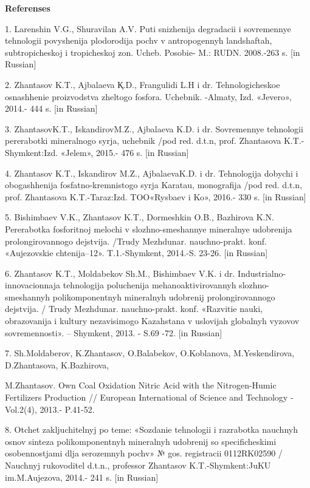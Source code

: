 \begin{center}
{\bfseries Referenses}
\end{center}

\begin{noparindent}
1. Larenshin V.G., Shuravilan A.V. Puti snizhenija degradacii i
sovremennye tehnologii povyshenija plodorodija pochv v antropogennyh
landshaftah, subtropicheskoj i tropicheskoj zon. Ucheb. Posobie- M.:
RUDN. 2008.-263 s. {[}in Russian{]}

2. Zhantasov K.T., Ajbalaeva Қ.D., Frangulidi L.H i dr. Tehnologicheskoe
osnashhenie proizvodstva zheltogo fosfora. Uchebnik. -Almaty, Izd.
«Jevero», 2014.- 444 s. {[}in Russian{]}

3. ZhantasovK.T., IskandirovM.Z., Ajbalaeva K.D. i dr. Sovremennye
tehnologii pererabotki mineral\textquotesingle nogo
syr\textquotesingle ja, uchebnik /pod red. d.t.n, prof. Zhantasova
K.T.-Shymkent:Izd. «Jelem», 2015.- 476 s. {[}in Russian{]}

4. Zhantasov K.T., Iskandirov M.Z., AjbalaevaK.D. i dr. Tehnologija
dobychi i obogashhenija fosfatno-kremnistogo syr\textquotesingle ja
Karatau, monografija /pod red. d.t.n, prof. Zhantasova K.T.-Taraz:Izd.
TOO«Rysbaev i Ko», 2016.- 330 s. {[}in Russian{]}

5. Bishimbaev V.K., Zhantasov K.T., Dormeshkin O.B., Bazhirova K.N.
Pererabotka fosforitnoj melochi v slozhno-smeshannye
mineral\textquotesingle nye udobrenija prolongirovannogo dejstvija.
/Trudy Mezhdunar. nauchno-prakt. konf. «Aujezovskie chtenija--12».
T.1.-Shymkent, 2014.-S. 23-26. {[}in Russian{]}

6. Zhantasov K.T., Moldabekov Sh.M., Bishimbaev V.K. i dr.
Industrial\textquotesingle no-innovacionnaja tehnologija poluchenija
mehanoaktivirovannyh slozhno-smeshannyh polikomponentnyh
mineral\textquotesingle nyh udobrenij prolongirovannogo dejstvija. /
Trudy Mezhdunar. nauchno-prakt. konf. «Razvitie nauki, obrazovanija i
kul\textquotesingle tury nezavisimogo Kazahstana v uslovijah
global\textquotesingle nyh vyzovov sovremennosti». -- Shymkent, 2013. -
S.69 -72. {[}in Russian{]}

7. Sh.Moldaberov, K.Zhantasov, O.Balabekov, O.Koblanova, M.Yeskendirova,
D.Zhantasova, K.Bazhirova,

M.Zhantasov. Own Coal Oxidation Nitric Acid
with the Nitrogen-Humic Fertilizers Production // European International
of Science and Technology -Vol.2(4), 2013.- P.41-52.

8. Otchet zakljuchitel\textquotesingle nyj po teme: «Sozdanie tehnologii
i razrabotka nauchnyh osnov sinteza polikomponentnyh
mineral\textquotesingle nyh udobrenij so specificheskimi osobennostjami
dlja serozemnyh pochv» № gos. registracii 0112RK02590 / Nauchnyj
rukovoditel\textquotesingle{} d.t.n., professor Zhantasov
K.T.-Shymkent:JuKU im.M.Aujezova, 2014.- 241 s. {[}in Russian{]}


\end{noparindent}
